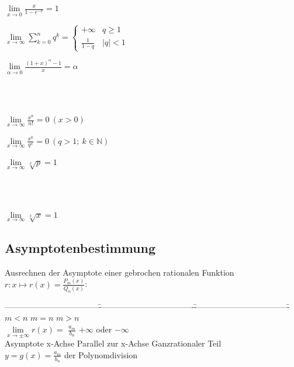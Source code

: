   		\begin{minipage}[c]{6.33cm}
			$ \lim\limits_{x \to 0} \frac{x}{1-e^{-x}}=1 $
  		\end{minipage}
  		\begin{minipage}[c]{6.33cm}
			$ \lim\limits_{x \to \infty} \sum_{k=0}^n q^k = \begin{cases}+\infty &q \geq 1\\ \frac{1}{1-q} &|q|<1\end{cases} $
  		\end{minipage}
  		\begin{minipage}[c]{6.33cm}
			$ \lim\limits_{\alpha \to 0} \frac{(1+x)^{\alpha}-1}{x} = \alpha $
  		\end{minipage} \\ \\
  		\begin{minipage}[c]{6.33cm}
			$ \lim\limits_{x \to \infty} \frac{x^n}{n!} = 0 \:(x>0) $
  		\end{minipage}
  		\begin{minipage}[c]{6.33cm}
			$ \lim\limits_{x \to \infty} \frac{x^k}{q^x}=0 \:(q>1; \:k\in \mathbb{N}) $
  		\end{minipage}
  		\begin{minipage}[c]{6.33cm}
			$ \lim\limits_{x \to \infty} \sqrt[x]{p}=1 $
  		\end{minipage} \\ \\
  		\begin{minipage}[c]{6.33cm}
			$ \lim\limits_{x \to \infty} \sqrt[x]{x}=1 $
  		\end{minipage}

	\subsection{Asymptotenbestimmung}
		Ausrechnen der Asymptote einer gebrochen rationalen Funktion $r: x \mapsto r(x)=\frac{P_m(x)}{Q_n(x)}$:
		\begin{tabbing}
		-----------------------------------\=-----------------------------------\=-----------------------------------\=\kill
			\>$m < n$ \>$m=n$ \>$m > n$\\
			$\lim\limits_{x\to \pm \infty} r(x) = $ 
			 \>$\frac{a_m}{b_n}$ \> $+\infty$ oder $-\infty$\\
			Asymptote 
			\>x-Achse \>Parallel zur x-Achse \>Ganzrationaler Teil\\
			\> \>$y = g(x) = \frac{a_m}{b_n}$ \>der Polynomdivision
		\end{tabbing}